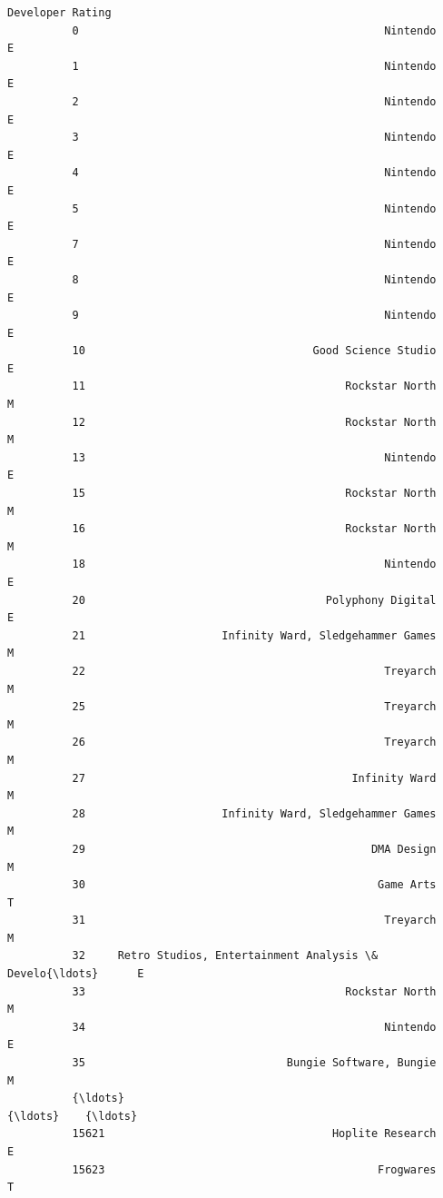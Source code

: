 \documentclass[11pt]{article}
\begin{document}
\begin{Verbatim}[commandchars=\\\{\}]
                                                         Developer Rating  
          0                                               Nintendo      E  
          1                                               Nintendo      E  
          2                                               Nintendo      E  
          3                                               Nintendo      E  
          4                                               Nintendo      E  
          5                                               Nintendo      E  
          7                                               Nintendo      E  
          8                                               Nintendo      E  
          9                                               Nintendo      E  
          10                                   Good Science Studio      E  
          11                                        Rockstar North      M  
          12                                        Rockstar North      M  
          13                                              Nintendo      E  
          15                                        Rockstar North      M  
          16                                        Rockstar North      M  
          18                                              Nintendo      E  
          20                                     Polyphony Digital      E  
          21                     Infinity Ward, Sledgehammer Games      M  
          22                                              Treyarch      M  
          25                                              Treyarch      M  
          26                                              Treyarch      M  
          27                                         Infinity Ward      M  
          28                     Infinity Ward, Sledgehammer Games      M  
          29                                            DMA Design      M  
          30                                             Game Arts      T  
          31                                              Treyarch      M  
          32     Retro Studios, Entertainment Analysis \& Develo{\ldots}      E  
          33                                        Rockstar North      M  
          34                                              Nintendo      E  
          35                               Bungie Software, Bungie      M  
          {\ldots}                                                  {\ldots}    {\ldots}  
          15621                                   Hoplite Research      E  
          15623                                          Frogwares      T  

\end{Verbatim}
\end{document}
